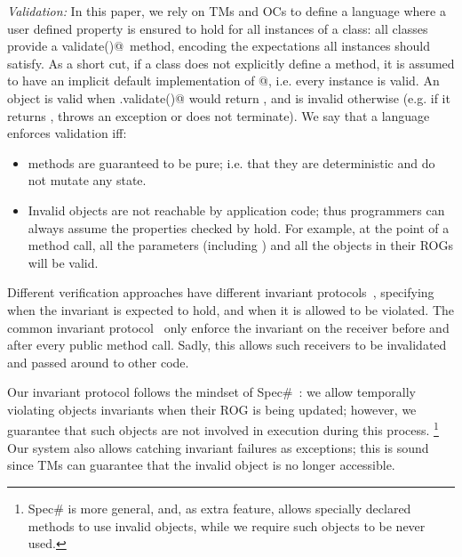 \loseSpace
\noindent\textit{Validation:}
\label{s:validation}
In this paper, we rely on TMs and OCs to define a language where a user defined property is ensured to hold for all instances of a class:
all classes provide a \Q@Bool validate()@\ method, encoding the expectations all instances should satisfy.
As a short cut, if a class does not explicitly define a
\validate{} method, it is assumed to have an implicit default implementation of @, i.e. every instance is valid.
An object \Q@o@ is valid when \Q@o.validate()@ would return \Q@true@, and is invalid otherwise (e.g. if it returns \Q@false@, throws an exception or does not terminate).
We say that a language enforces validation iff:
\begin{itemize}
\item \validate{} methods are guaranteed to be pure; i.e. that they are deterministic and do not mutate any state.%
\item Invalid objects are not reachable by application code; thus programmers can always assume the properties checked by \validate{} hold.
For example, at the point of a method call, all the parameters (including \Q@this@) and all the objects in their ROGs will be valid.
\end{itemize}
Different verification approaches have different invariant protocols~\cite{FlexibleInvariants}, specifying when the invariant is expected to hold, and when it is allowed to be violated.
The common invariant protocol~\cite{JML, OOSC..., D, Eiffel} only enforce the invariant on the receiver before and after every public method call. Sadly, this allows such receivers to be invalidated and passed around to other code.

Our invariant protocol follows the mindset of Spec\#~\cite{TODO}: we allow temporally violating objects invariants when their ROG is being updated; however, we guarantee that such objects are not involved in execution during this process. \footnote{Spec\# 
is more general, and, as extra feature, allows specially declared methods to use invalid objects, while we require such objects to be never used.}
Our system also allows catching invariant failures as exceptions; this is sound since TMs can guarantee that the invalid object is no longer accessible.


